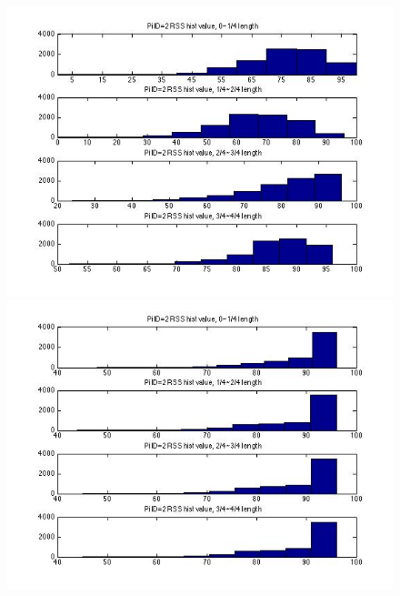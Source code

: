 \documentclass[10pt,conference]{IEEEtran}
\begin{document}
\begin{figure}[htbp]
\centering
\begin{minipage}[t]{0.2\textwidth}
	\centering
	\includegraphics[scale=0.2]{time2-1}
\end{minipage}
\begin{minipage}[t]{0.2\textwidth}
	\centering
	\includegraphics[scale=0.2]{time2-2}
\end{minipage}
\begin{minipage}[t]{0.2\textwidth}

\end{minipage}
\end{figure}
\end{document}
